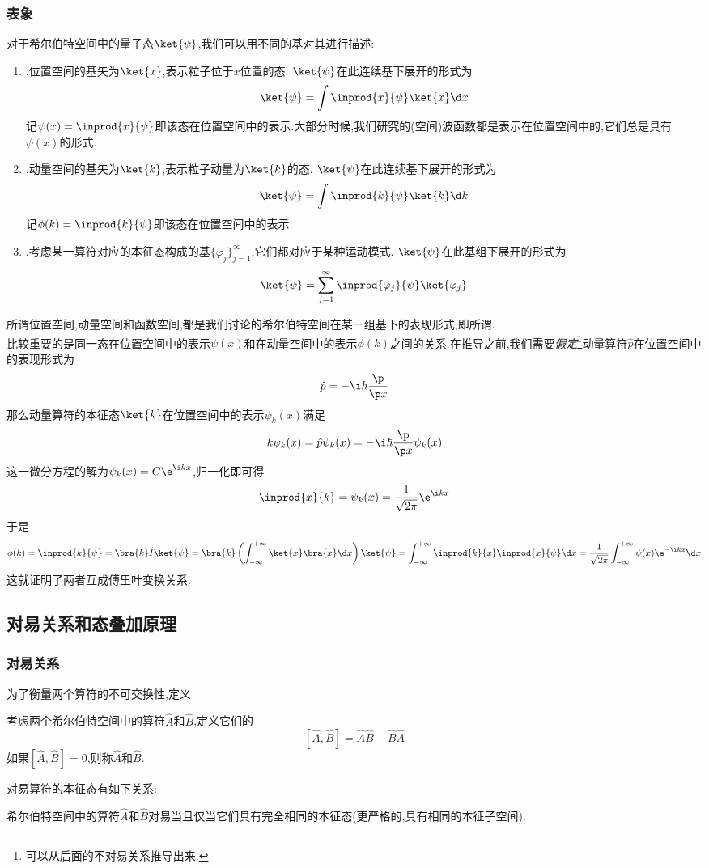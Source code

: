 \documentclass{ctexbook}
\begin{document}
\subsubsection{表象}
\indent 对于希尔伯特空间中的量子态$\ket{\psi}$,我们可以用不同的基对其进行描述:
\begin{enumerate}[label=\tbf{\alph*.}]
    \item {}.位置空间的基矢为$\ket{x}$,表示粒子位于$x$位置的态. $\ket{\psi}$在此连续基下展开的形式为
    \[\ket{\psi}=\int\inprod{x}{\psi}\ket{x}\d x\]
    记$\psi(x)=\inprod{x}{\psi}$即该态在位置空间中的表示.大部分时候,我们研究的(空间)波函数都是表示在位置空间中的,它们总是具有$\psi(x)$的形式.
    \item {}.动量空间的基矢为$\ket{k}$,表示粒子动量为$\ket{k}$的态. $\ket{\psi}$在此连续基下展开的形式为
    \[\ket{\psi}=\int\inprod{k}{\psi}\ket{k}\d k\]
    记$\phi(k)=\inprod{k}{\psi}$即该态在位置空间中的表示.
    \item {}.考虑某一算符对应的本征态构成的基$\{\varphi_j\}_{j=1}^{\infty}$,它们都对应于某种运动模式. $\ket{\psi}$在此基组下展开的形式为
    \[\ket{\psi}=\sum_{j=1}^{\infty}\inprod{\varphi_j}{\psi}\ket{\varphi_j}\]
\end{enumerate}
所谓位置空间,动量空间和函数空间,都是我们讨论的希尔伯特空间在某一组基下的表现形式,即所谓.\\
\indent 比较重要的是同一态在位置空间中的表示$\psi(x)$和在动量空间中的表示$\phi(k)$之间的关系.在推导之前,我们需要\textit{假定}\footnote{可以从后面的不对易关系推导出来.}动量算符$\hat{p}$在位置空间中的表现形式为
\[\hat{p}=-\i\hbar\dfrac{\p}{\p x}\]
那么动量算符的本征态$\ket{k}$在位置空间中的表示$\psi_{k}(x)$满足
\[k\psi_{k}(x)=\hat{p}\psi_k(x)=-\i\hbar\dfrac{\p}{\p x}\psi_k(x)\]
这一微分方程的解为$\psi_{k}(x)=C\e^{\i kx}$,归一化即可得
\[\inprod{x}{k}=\psi_k(x)=\dfrac{1}{\sqrt{2\pi}}\e^{\i kx}\]
于是
\[\phi(k)=\inprod{k}{\psi}=\bra{k}\hat{I}\ket{\psi}=\bra{k}\left(\int_{-\infty}^{+\infty}\ket{x}\bra{x}\d x\right)\ket{\psi}=\int_{-\infty}^{+\infty}\inprod{k}{x}\inprod{x}{\psi}\d x=\dfrac{1}{\sqrt{2\pi}}\int_{-\infty}^{+\infty}\psi(x)\e^{-\i kx}\d x\]
这就证明了两者互成傅里叶变换关系.
\subsection{对易关系和态叠加原理}
\subsubsection{对易关系}
为了衡量两个算符的不可交换性,定义
\begin{theorem}[对易子和对易算符]
    考虑两个希尔伯特空间中的算符$\hat{A}$和$\hat{B}$,定义它们的
    \[[\hat{A},\hat{B}]=\hat{A}\hat{B}-\hat{B}\hat{A}\]
    如果$[\hat{A},\hat{B}]=0$,则称$\hat{A}$和$\hat{B}$.
\end{theorem}
对易算符的本征态有如下关系:
\begin{theorem}
    希尔伯特空间中的算符$\hat{A}$和$\hat{B}$对易当且仅当它们具有完全相同的本征态(更严格的,具有相同的本征子空间).
\end{theorem}
\end{document}
